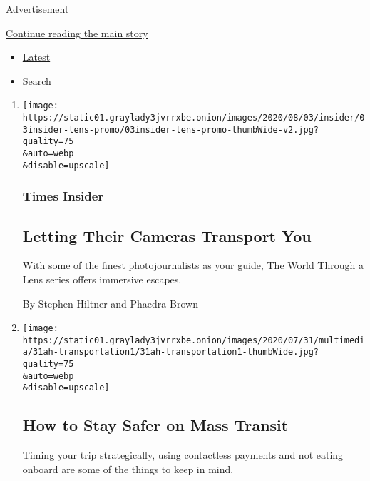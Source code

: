 Advertisement

\protect\hyperlink{after-mid2}{Continue reading the main story}

\begin{itemize}
\tightlist
\item
  \protect\hyperlink{stream-panel}{Latest}
\item
  Search
\end{itemize}

\begin{enumerate}
\def\labelenumi{\arabic{enumi}.}
\item
  \href{/2020/08/03/insider/letting-their-cameras-transport-you.html}{}

  \texttt{[image: https://static01.graylady3jvrrxbe.onion/images/2020/08/03/insider/03insider-lens-promo/03insider-lens-promo-thumbWide-v2.jpg?quality=75\\\&auto=webp\\\&disable=upscale]}

  \hypertarget{times-insider}{%
  \subsubsection{Times Insider}\label{times-insider}}

  \hypertarget{letting-their-cameras-transport-you}{%
  \subsection{Letting Their Cameras Transport
  You}\label{letting-their-cameras-transport-you}}

  With some of the finest photojournalists as your guide, The World
  Through a Lens series offers immersive escapes.

  By Stephen Hiltner and Phaedra Brown
\item
  \href{/2020/08/01/at-home/coronavirus-public-transportation-subway.html}{}

  \texttt{[image: https://static01.graylady3jvrrxbe.onion/images/2020/07/31/multimedia/31ah-transportation1/31ah-transportation1-thumbWide.jpg?quality=75\\\&auto=webp\\\&disable=upscale]}

  \hypertarget{how-to-stay-safer-on-mass-transit}{%
  \subsection{How to Stay Safer on Mass
  Transit}\label{how-to-stay-safer-on-mass-transit}}

  Timing your trip strategically, using contactless payments and not
  eating onboard are some of the things to keep in mind.


\end{enumerate}
